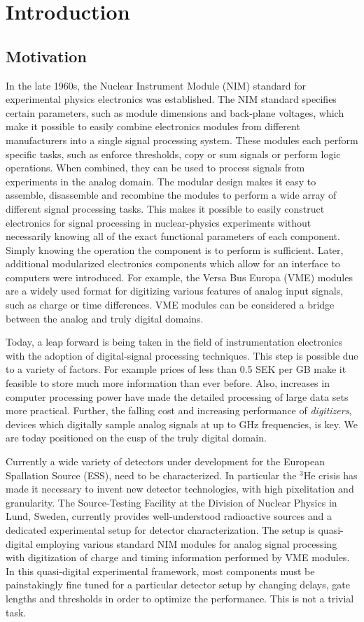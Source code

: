 \documentclass[main.tex]{subfiles}
\begin{document}
\chapter{Introduction}\label{ch:1}
\section{Motivation}
In the late 1960s, the Nuclear Instrument Module (NIM) standard for experimental physics electronics was established. The NIM standard specifies certain parameters, such as module dimensions and back-plane voltages, which make it possible to easily combine electronics modules from different manufacturers into a single signal processing system. These modules each perform specific tasks, such as enforce thresholds, copy or sum signals or perform logic operations. When combined, they can be used to process signals from experiments in the analog domain. The modular design makes it easy to assemble, disassemble and recombine the modules to perform a wide array of different signal processing tasks. 
This makes it possible to easily construct electronics for signal processing in nuclear-physics experiments without necessarily knowing all of the exact functional parameters of each component. Simply knowing the operation the component is to perform is sufficient. Later, additional modularized electronics components which allow for an interface to computers were introduced. For example, the Versa Bus Europa (VME) modules are a widely used format for digitizing various features of analog input signals, such as charge or time differences. VME modules can be considered a bridge between the analog and truly digital domains.

Today, a leap forward is being taken in the field of instrumentation electronics with the adoption of digital-signal processing techniques. This step is possible due to a variety of factors. For example prices of less than 0.5 SEK per GB make it feasible to store much more information than ever before. Also, increases in computer processing power have made the detailed processing of large data sets more practical. Further, the falling cost and increasing performance of \textit{digitizers}, devices which digitally sample analog signals at up to GHz frequencies, is key. We are today positioned on the cusp of the truly digital domain.

Currently a wide variety of detectors under development for the European Spallation Source (ESS), need to be characterized. In particular the $^\textrm{3}$He crisis has made it necessary to invent new detector technologies, with high pixelitation and granularity. The Source-Testing Facility at the Division of Nuclear Physics in Lund, Sweden, currently provides well-understood radioactive sources and a dedicated experimental setup for detector characterization. 
The setup is quasi-digital employing various standard NIM modules for analog signal processing with digitization of charge and timing information performed by VME modules. In this quasi-digital experimental framework, most components must be painstakingly fine tuned for a particular detector setup by changing delays, gate lengths and thresholds in order to optimize the performance. This is not a trivial task. 
\end{document}
